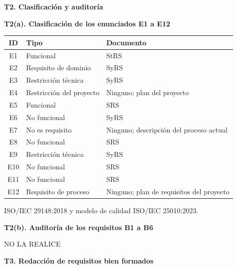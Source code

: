 \documentclass[11pt,a4paper]{article}
\newcommand{\apartado}[1]{\par\noindent\textbf{#1}\par\vspace{4pt}}
\begin{document}
\apartado{T2. Clasificación y auditoría}

\textbf{T2(a). Clasificación de los enunciados E1 a E12}

\noindent\begin{tabularx}{\linewidth}{|c|Y|Y|}
\hline
\textbf{ID} & \textbf{Tipo} & \textbf{Documento}\\
\hline
E1 & Funcional & StRS\\
\hline
E2 & Requisito de dominio & SyRS\\
\hline
E3 & Restricción técnica & SyRS\\
\hline
E4 & Restricción del proyecto & Ninguno; plan del proyecto\\
\hline
E5 & Funcional & SRS\\
\hline
E6 & No funcional & SyRS\\
\hline
E7 & No es requisito & Ninguno; descripción del proceso actual\\
\hline
E8 & No funcional & SRS\\
\hline
E9 & Restricción técnica & SyRS\\
\hline
E10 & No funcional & SRS\\
\hline
E11 & No funcional & SRS\\
\hline
E12 & Requisito de proceso & Ninguno; plan de requisitos del proyecto\\
\hline
\end{tabularx}

ISO/IEC 29148:2018 y modelo de calidad ISO/IEC 25010:2023.

\textbf{T2(b). Auditoría de los requisitos B1 a B6}

NO LA REALICE

\apartado{T3. Redacción de requisitos bien formados}
\end{document}

